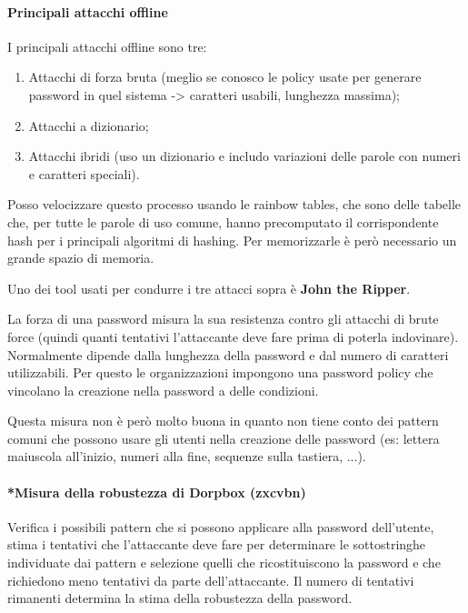  \paragraph{Principali attacchi offline}
 I principali attacchi offline sono tre: 
 \begin{enumerate}
     \item Attacchi di forza bruta (meglio se conosco le policy usate per generare password in quel sistema -> caratteri usabili, lunghezza massima); 
     \item Attacchi a dizionario;
     \item Attacchi ibridi (uso un dizionario e includo variazioni delle parole con numeri e caratteri speciali).
 \end{enumerate}

\noindent Posso velocizzare questo processo usando le rainbow tables, che sono delle tabelle che, per tutte le parole di uso comune, hanno precomputato il corrispondente hash per i principali algoritmi di hashing. Per memorizzarle è però necessario un grande spazio di memoria. 

Uno dei tool usati per condurre i tre attacci sopra è \textbf{John the Ripper}.  

La forza di una password misura la sua resistenza contro gli attacchi di brute force (quindi quanti tentativi l'attaccante deve fare prima di poterla indovinare). Normalmente dipende dalla lunghezza della password e dal numero di caratteri utilizzabili. Per questo le organizzazioni impongono una password policy che vincolano la creazione nella password a delle condizioni. 

Questa misura non è però molto buona in quanto non tiene conto dei pattern comuni che possono usare gli utenti nella creazione delle password (es: lettera maiuscola all'inizio, numeri alla fine, sequenze sulla tastiera, ...).

\paragraph{*Misura della robustezza di Dorpbox (zxcvbn)} Verifica i possibili pattern che si possono applicare alla password dell'utente, stima i tentativi che l'attaccante deve fare per determinare le sottostringhe individuate dai pattern e selezione quelli che ricostituiscono la password e che richiedono meno tentativi da parte dell'attaccante. Il numero di tentativi rimanenti determina la stima della robustezza della password.

